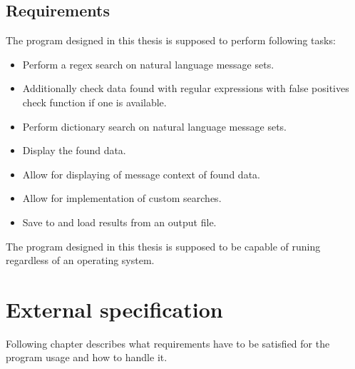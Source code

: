 \documentclass[a4paper,twoside,12pt]{book}
\begin{document}
\section{Requirements}

The program designed in this thesis is supposed to perform following tasks:
\begin{itemize}
   \item Perform a regex search on natural language message sets.
   \item Additionally check data found with regular expressions with false positives check function if one is available.
   \item Perform dictionary search on natural language message sets.
   \item Display the found data.
   \item Allow for displaying of message context of found data.
   \item Allow for implementation of custom searches.
   \item Save to and load results from an output file.
\end{itemize}

The program designed in this thesis is supposed to be capable of runing regardless of an operating system.



\chapter{External specification}

Following chapter describes what requirements have to be satisfied for the program usage and how to handle it.
\end{document}
